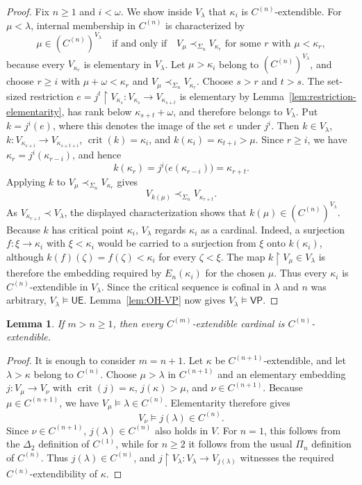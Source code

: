 \documentclass[11pt,a4paper]{amsart}
\newcommand{\VP}{\mathsf{VP}}
\newcommand{\restr}{\mathbin{\upharpoonright}}
\newcommand{\crit}{\operatorname{crit}}
\newcommand{\UE}{\mathsf{UE}}
\theoremstyle{plain}
\newtheorem{lemma}[theorem]{Lemma}
\theoremstyle{definition}
\theoremstyle{remark}
\begin{document}
\begin{proof}
Fix $n\geq1$ and $i<\omega$.  We show inside $V_\lambda$ that $\kappa_i$ is $C^{(n)}$-extendible.  For $\mu<\lambda$, internal membership in $C^{(n)}$ is characterized by
\[
\mu\in(C^{(n)})^{V_\lambda}
\quad\text{if and only if}\quad
V_\mu\prec_{\Sigma_n}V_{\kappa_r}
\text{ for some }r\text{ with }\mu<\kappa_r,
\]
 because every $V_{\kappa_r}$ is elementary in $V_\lambda$.  Let $\mu>\kappa_i$ belong to $(C^{(n)})^{V_\lambda}$, and choose $r\geq i$ with $\mu+\omega<\kappa_r$ and $V_\mu\prec_{\Sigma_n}V_{\kappa_r}$.  Choose $s>r$ and $t>s$.  The set-sized restriction $e=j^t\restr V_{\kappa_s}:V_{\kappa_s}\longrightarrow V_{\kappa_{s+t}}$ is elementary by Lemma~\ref{lem:restriction-elementarity}, has rank below $\kappa_{s+t}+\omega$, and therefore belongs to $V_\lambda$.  Put $k=j^i(e)$, where this denotes the image of the set $e$ under $j^i$.  Then $k\in V_\lambda$, $k:V_{\kappa_{s+i}}\longrightarrow V_{\kappa_{s+t+i}}$, $\crit(k)=\kappa_i$, and $k(\kappa_i)=\kappa_{t+i}>\mu$.
Since $r\geq i$, we have $\kappa_r=j^i(\kappa_{r-i})$, and hence
\[
k(\kappa_r)=j^i\bigl(e(\kappa_{r-i})\bigr)=\kappa_{r+t}.
\]
Applying $k$ to $V_\mu\prec_{\Sigma_n}V_{\kappa_r}$ gives
\[
V_{k(\mu)}\prec_{\Sigma_n}V_{\kappa_{r+t}}.
\]
As $V_{\kappa_{r+t}}\prec V_\lambda$, the displayed characterization shows that $k(\mu)\in(C^{(n)})^{V_\lambda}$.  Because $k$ has critical point $\kappa_i$, $V_\lambda$ regards $\kappa_i$ as a cardinal.  Indeed, a surjection $f:\xi\to\kappa_i$ with $\xi<\kappa_i$ would be carried to a surjection from $\xi$ onto $k(\kappa_i)$, although $k(f)(\zeta)=f(\zeta)<\kappa_i$ for every $\zeta<\xi$.  The map $k\restr V_\mu\in V_\lambda$ is therefore the embedding required by $E_n(\kappa_i)$ for the chosen $\mu$.  Thus every $\kappa_i$ is $C^{(n)}$-extendible in $V_\lambda$.  Since the critical sequence is cofinal in $\lambda$ and $n$ was arbitrary, $V_\lambda\models\UE$.  Lemma~\ref{lem:OH-VP} now gives $V_\lambda\models\VP$.
\end{proof}

\begin{lemma}\label{lem:Cn-downward}
If $m>n\geq1$, then every $C^{(m)}$-extendible cardinal is $C^{(n)}$-extendible.
\end{lemma}

\begin{proof}
 It is enough to consider $m=n+1$.  Let $\kappa$ be $C^{(n+1)}$-extendible, and let $\lambda>\kappa$ belong to $C^{(n)}$.  Choose $\mu>\lambda$ in $C^{(n+1)}$ and an elementary embedding $j:V_\mu\longrightarrow V_\nu$ with $\crit(j)=\kappa$, $j(\kappa)>\mu$, and $\nu\in C^{(n+1)}$.  Because $\mu\in C^{(n+1)}$, we have $V_\mu\models\lambda\in C^{(n)}$.  Elementarity therefore gives
\[
V_\nu\models j(\lambda)\in C^{(n)}.
\]
 Since $\nu\in C^{(n+1)}$, $j(\lambda)\in C^{(n)}$ also holds in $V$.  For $n=1$, this follows from the $\Delta_2$ definition of $C^{(1)}$, while for $n\geq2$ it follows from the usual $\Pi_n$ definition of $C^{(n)}$.  Thus $j(\lambda)\in C^{(n)}$, and $j\restr V_\lambda:V_\lambda\longrightarrow V_{j(\lambda)}$ witnesses the required $C^{(n)}$-extendibility of $\kappa$.
\end{proof}
\end{document}
